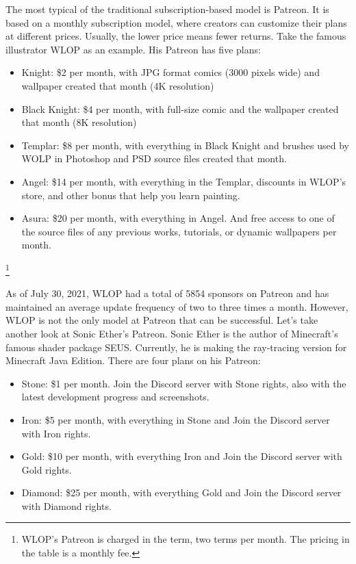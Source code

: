\documentclass[12pt,a4paper]{article}
\begin{document}
    The most typical of the traditional subscription-based model is Patreon.
    It is based on a monthly subscription model, where creators can customize
    their plans at different prices.
    Usually, the lower price means fewer returns.
    Take the famous illustrator WLOP as an example.
    His Patreon has five plans\cite{wlop_patreon}:
    \begin{itemize}
        \item Knight: \$2 per month, with JPG format comics (3000 pixels wide)
        and wallpaper created that month (4K resolution)
        \item Black Knight: \$4 per month, with full-size comic and the wallpaper
        created that month (8K resolution)
        \item Templar: \$8 per month, with everything in Black Knight and brushes
        used by WOLP in Photoshop and PSD source files created that month.
        \item Angel: \$14 per month, with everything in the Templar, discounts
        in WLOP's store, and other bonus that help you learn painting.
        \item Asura: \$20 per month, with everything in Angel. And free
        access to one of the source files of any previous works, tutorials, or
        dynamic wallpapers per month.
    \end{itemize}\footnote{
        WLOP's Patreon is charged in the term, two terms per month.
        The pricing in the table is a monthly fee.
    }

    As of July 30, 2021, WLOP had a total of 5854 sponsors on Patreon and has
    maintained an average update frequency of two to three times a month.
    However, WLOP is not the only model at Patreon that can be successful.
    Let's take another look at Sonic Ether's Patreon.
    Sonic Ether is the author of Minecraft's famous shader package SEUS.
    Currently, he is making the ray-tracing version for Minecraft Java Edition.
    There are four plans on his Patreon\cite{seus_patreon}:
    \begin{itemize}
        \item Stone: \$1 per month. Join the Discord server with Stone rights,
        also with the latest development progress and screenshots.
        \item Iron: \$5 per month, with everything in Stone and Join the Discord
        server with Iron rights.
        \item Gold: \$10 per month, with everything Iron and Join the Discord
        server with Gold rights.
        \item Diamond: \$25 per month, with everything Gold and Join the Discord
        server with Diamond rights.
    \end{itemize}
\end{document}
